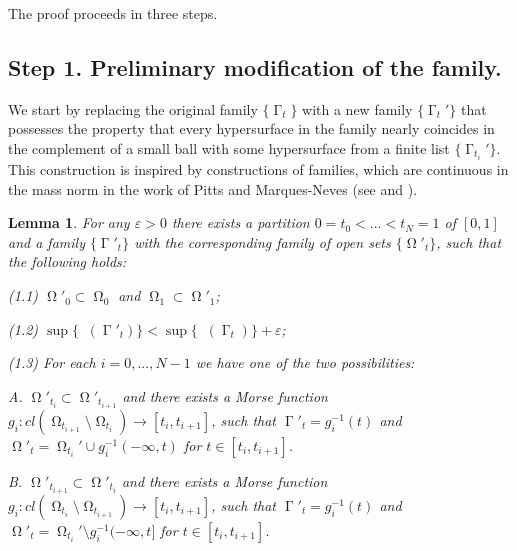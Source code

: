 \documentclass[12pt]{amsart}
\newtheorem{theorem}{Theorem}[section]
\newtheorem{proposition*}{Proposition}
\newtheorem{lemma}[theorem]{Lemma}
\DeclareMathOperator{\Hn}{\mathcal{H}^n}
\DeclareMathOperator{\G}{\Gamma}
\DeclareMathOperator{\Om}{\Omega}
\theoremstyle{definition}
\begin{document}




The proof proceeds in three steps.

\subsection{Step 1. Preliminary modification of the family.}
We start by replacing the original family $\{\G_t\}$
with a new family $\{\G_t'\}$
that possesses the property that
every hypersurface in the family nearly coincides in the complement
of a small ball with some hypersurface
from a finite list $\{\G_{t_i}' \}$.
This construction is inspired by
constructions of families, which are continuous
in the mass norm in the work of Pitts and 
Marques-Neves (see \cite[4.5]{Pi} and \cite[Theorem 14.1]{MN1}).



\begin{lemma} \label{continuity in mass norm}
 For any $\varepsilon>0$ there exists 
 a partition $0=t_0< ... < t_N=1$ of $[0,1]$ and
 a family $\{\G'_t\}$ with the corresponding
 family of open sets $\{\Om'_t\}$, such that 
 the following holds:
 
  (1.1) $\Om'_0 \subset \Om_0$ and $\Om_1 \subset \Om'_1$;
  
  (1.2) $\sup \{\Hn(\G'_t) \} < \sup \{\Hn(\G_t) \} + \varepsilon$;
  
  
  (1.3) For each $i=0,...,N-1$ we have one of the two possibilities:
  
        A. $\Om'_{t_i} \subset \Om'_{t_{i+1}}$ and there exists a Morse function
        $g_i: cl(\Om_{t_{i+1}} \setminus \Om_{t_i}) \rightarrow [t_i, t_{i+1}]$, such that
        $\G'_t = g_i^{-1}(t)$ and $\Om'_t = \Om_{t_i}' \cup g_i^{-1}(-\infty,t)$
        for $t \in [t_i, t_{i+1}]$.
  
        B. $\Om'_{t_{i+1}} \subset \Om'_{t_i}$ and there exists a Morse function
        $g_i: cl(\Om_{t_i} \setminus \Om_{t_{i+1}}) \rightarrow [t_i, t_{i+1}]$, such that
        $\G'_t = g_i^{-1}(t)$ and $\Om'_t = \Om_{t_i}' \setminus g_i^{-1}(-\infty,t]$
        for $t \in [t_i, t_{i+1}]$.
 

\end{lemma}
\end{document}

